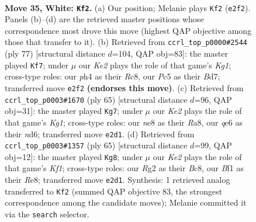 \documentclass[11pt]{article}
\begin{document}
\clearpage

\begin{figure}[p]\centering
\begin{subfigure}{0.46\textwidth}\centering
\resizebox{\linewidth}{!}{%
\newchessgame
\chessboard[
  setfen={1r1rnk2/p1p5/4qp2/2P5/3P1P1p/1P6/1Q1BK1RP/5BR1 w - - 1 35},
  showmover=false,
  pgfstyle=straightmove, color=movearrow, markmove={e2-f2}
]}
\caption{}
\end{subfigure}\hfill
\begin{subfigure}{0.46\textwidth}\centering
\resizebox{\linewidth}{!}{%
\newchessgame
\chessboard[
  setfen={2r1r1k1/3bp2q/p2p1p2/3P4/3N1Q1P/6R1/1P4P1/4R2K b - - 7 39},
  showmover=false,
  pgfstyle=straightmove, color=movearrow, markmove={g8-f7}
]}
\caption{}
\end{subfigure}
\\[4pt]
\begin{subfigure}{0.46\textwidth}\centering
\resizebox{\linewidth}{!}{%
\newchessgame
\chessboard[
  setfen={rr4k1/4qp2/p2N2p1/4p1b1/PPQ4p/5P1P/6P1/1R1R3K b - - 0 33},
  showmover=false,
  pgfstyle=straightmove, color=movearrow, markmove={g8-g7}
]}
\caption{}
\end{subfigure}\hfill
\begin{subfigure}{0.46\textwidth}\centering
\resizebox{\linewidth}{!}{%
\newchessgame
\chessboard[
  setfen={2b1rk2/4r2q/p3pp2/P2p1p1p/1Q1N1P2/3PR3/6PP/4R2K b - - 2 33},
  showmover=false,
  pgfstyle=straightmove, color=movearrow, markmove={f8-g8}
]}
\caption{}
\end{subfigure}
\caption{\textbf{Move 35, White: \texttt{Kf2}.} (a) Our position; Melanie plays \texttt{Kf2} (\texttt{e2f2}). Panels (b)--(d) are the retrieved master positions whose correspondence most drove this move (highest QAP objective among those that transfer to it). (b) Retrieved from \texttt{ccrl\_top\_p0000\#2544} (ply 77) [structural distance $d$=104, QAP obj=83]: the master played \texttt{Kf7}; under $\mu$ our \emph{Ke2} plays the role of that game's \emph{Kg1}; cross-type roles: our \emph{p}h4 as their \emph{R}c8, our \emph{P}c5 as their \emph{B}d7; transferred move \texttt{e2f2} \textbf{(endorses this move)}. (c) Retrieved from \texttt{ccrl\_top\_p0003\#1670} (ply 65) [structural distance $d$=96, QAP obj=31]: the master played \texttt{Kg7}; under $\mu$ our \emph{Ke2} plays the role of that game's \emph{Kg1}; cross-type roles: our \emph{n}e8 as their \emph{R}a8, our \emph{q}e6 as their \emph{n}d6; transferred move \texttt{e2d1}. (d) Retrieved from \texttt{ccrl\_top\_p0003\#1357} (ply 65) [structural distance $d$=99, QAP obj=12]: the master played \texttt{Kg8}; under $\mu$ our \emph{Ke2} plays the role of that game's \emph{Kf1}; cross-type roles: our \emph{R}g2 as their \emph{B}c8, our \emph{B}f1 as their \emph{R}e8; transferred move \texttt{e2d1}. Synthesis: 1 retrieved analog transferred to \texttt{Kf2} (summed QAP objective 83, the strongest correspondence among the candidate moves); Melanie committed it via the \texttt{search} selector.}
\label{fig:thought-m68}
\end{figure}
\end{document}
